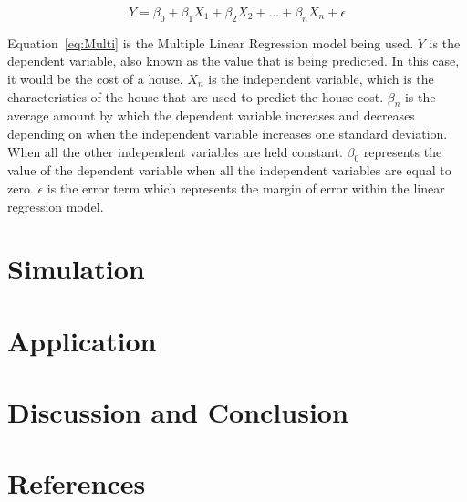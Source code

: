 \documentclass[12pt]{article}
\begin{document}
\begin{equation}
  \label{eq:Multi}
  Y = \beta_{0} + \beta_{1}X_{1} + \beta_{2}X_{2} + ... + \beta_{n}X_{n} + \epsilon
\end{equation}

Equation~\ref{eq:Multi} is the Multiple Linear Regression model being used. \(Y\) is the dependent variable, also known as the value that is being predicted. In this case, it would be the cost of a house. \(X_{n}\) is the independent variable, which is the characteristics of the house that are used to predict the house cost. \(\beta_{n}\) is the average amount by which the dependent variable increases and decreases depending on when the independent variable increases one standard deviation. When all the other independent variables are held constant. \(\beta_{0}\) represents the value of the dependent variable when all the independent variables are equal to zero. \(\epsilon\) is the error term which represents the margin of error within the linear regression model. 

\section{Simulation}
\label{sec:sim}


\section{Application}
\label{sec:app}


\section{Discussion and Conclusion}
\label{sec:disc}



\section{References}
\label{sec:refer}



\cite{singh2021machlearn}
\cite{alfiyantin2017regress}



\end{document}
